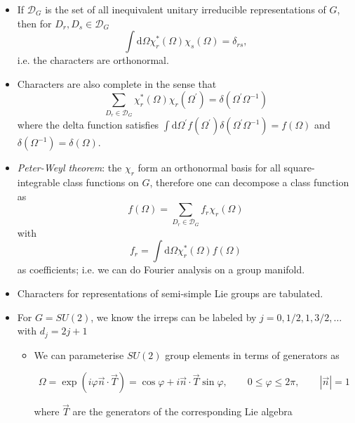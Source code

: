 \begin{itemize}
  \item If $\mathcal{D}_G$ is the set of all inequivalent unitary irreducible representations of $G$, then for $D_r, D_s \in \mathcal{D}_G$
\begin{equation}
    \int \text{d}\Omega \chi^*_r(\Omega) \chi_s(\Omega) = \delta_{rs},
\end{equation}
i.e. the characters are orthonormal.

    \item Characters are also complete in the sense that
\begin{equation}
    \sum_{D_r \in \mathcal{D}_G} \chi^*_r(\Omega) \chi_r(\Omega^\prime) = \delta(\Omega^\prime \Omega^{-1})
\end{equation}
where the delta function satisfies $\int \text{d} \Omega^\prime f(\Omega^\prime) \delta(\Omega^\prime \Omega^{-1}) = f(\Omega)$ and $\delta(\Omega^{-1}) = \delta(\Omega)$.
 
    \item \emph{Peter-Weyl theorem}: the $\chi_r$ form an orthonormal basis for all square-integrable class functions on $G$, therefore one can decompose a class function as
\begin{equation}
f(\Omega)=\sum_{D_{r} \in \mathcal{D}_G} f_{r} \chi_{r}(\Omega)
\end{equation}
with
\begin{equation}
f_{r}=\int \text{d} \Omega \chi_{r}^{*}(\Omega) f(\Omega)
\end{equation}
as coefficients; i.e. we can do Fourier analysis on a group manifold.

\item Characters for representations of semi-simple Lie groups are tabulated.
    \item For $G = SU(2)$, we know the irreps can be labeled by $j = 0, 1/2, 1, 3/2, \ldots$ with $d_j = 2j + 1$
\begin{itemize}
    \item We can parameterise $SU(2)$ group elements in terms of generators as 

\begin{equation}
\Omega=\exp (i \varphi \vec{n} \cdot \vec{T})=\cos \varphi+i \vec{n} \cdot \vec{T} \sin \varphi, \qquad 0 \leqslant \varphi \leqslant 2 \pi, \qquad|\vec{n}|=1
\end{equation}

where \(\vec{T}\) are the generators of the corresponding Lie algebra


\end{itemize}
\end{itemize}
